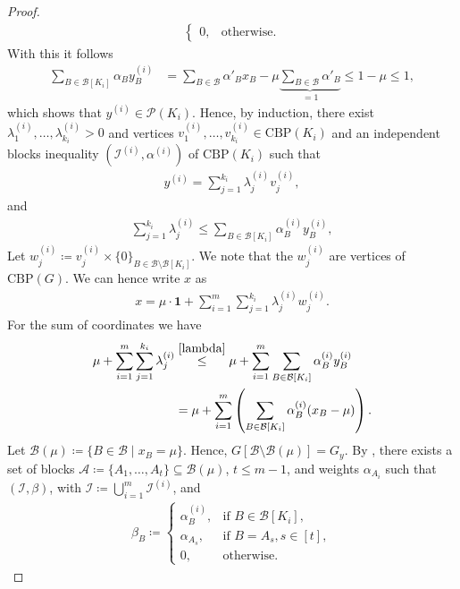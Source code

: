\documentclass[12pt]{amsart}
\newcommand{\CBP}{\mathrm{CBP}}
\renewcommand{\P}{\mathcal{P}}
\newcommand{\I}{\mathcal{I}}
\newcommand{\B}{\mathcal{B}}
\newcommand{\A}{\mathcal{A}}
\begin{document}
\begin{proof}
\begin{align*}
\begin{cases}
                                0,& \text{otherwise.}\end{cases}
    \end{align*}
    With this it follows
    \begin{align*}
        \sum_{B \in \B[K_i]}\alpha_By_B^{(i)}&=\sum_{B \in \B}\alpha'_Bx_B-\mu\underbrace{\sum_{B \in \B}\alpha'_B}_{=1} \le 1-\mu\le 1,
    \end{align*}
    which shows that $y^{(i)} \in \P(K_i)$. Hence, by induction, there exist $\lambda_1^{(i)},\ldots,\lambda_{k_i}^{(i)}>0$ and vertices $v_1^{(i)},\ldots,v_{k_i}^{(i)}\in \CBP(K_i)$ and an independent blocks inequality $(\I^{(i)},\alpha^{(i)})$ of $\CBP(K_i)$ such that
    \begin{align*}
        y^{(i)}=\sum_{j=1}^{k_i} \lambda_j^{(i)}v_j^{(i)},
    \end{align*}
    and
    \begin{align}
    \label{lambda}
        \sum_{j=1}^{k_i}\lambda_j^{(i)} \le \sum_{B \in \B[K_i]} \alpha^{(i)}_By^{(i)}_B,
    \end{align}
    Let $w_j^{(i)}\coloneqq v_j^{(i)} \times \{0\}_{B \in \B\setminus\B [K_i]}$. We note that the $w_j^{(i)}$ are vertices of $\CBP(G)$. We can hence write $x$ as
    \begin{align*}
        x=\mu \cdot \mathbf{1} + \sum_{i=1}^m\sum_{j=1}^{k_i} \lambda_j^{(i)}w_j^{(i)}.
    \end{align*}
    For the sum of coordinates we have
    \begin{align*}
        \mu+\sum_{i=1}^m\sum_{j=1}^{k_i} \lambda_j^{(i)} &\overset{\eqref{lambda}}{\le} \mu+\sum_{i=1}^m\sum_{B \in \B[K_i]} \alpha^{(i)}_By_B^{(i)} \\
        &= \mu+\sum_{i=1}^m \left(\sum_{B \in \B[K_i]} \alpha^{(i)}_B(x_B-\mu) \right).
    \end{align*}
    Let $\B(\mu) \coloneqq \{ B \in \B \mid x_B=\mu\}$. Hence, $G[\B \setminus \B(\mu)]=G_y$. By , there exists a set of blocks $\A\coloneqq \{A_1,\ldots,A_t\} \subseteq \B(\mu)$, $t \le m-1$, and weights $\alpha_{A_i}$ such that  $(\I,\beta)$, with $\I \coloneqq \bigcup_{i=1}^m\I^{(i)}$, and
    \begin{align*}
        \beta_B\coloneqq \begin{cases} \alpha^{(i)}_B, &\text{if } B \in \B[K_i], \\
                                       \alpha_{A_s}, &\text{if } B=A_s, s \in [t], \\
                                       0, &\text{otherwise}.

\end{cases}
\end{align*}
\end{proof}
\end{document}
